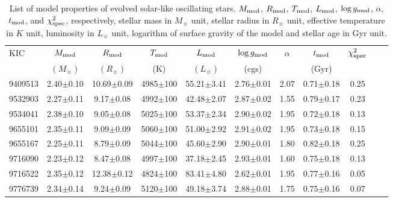 \documentclass[a4paper,fleqn,usenatbib]{mnras}     %
\begin{document}
{\begin{table*}
 \caption{List of model properties of evolved solar-like oscillating stars.
$M_{\rm mod}$, $R_{\rm mod}$, ${T_{\rm mod}}$, $L_{\rm mod}$, ${\log g_{\rm mod}}$, $\alpha$, $t_{\rm mod}$, and ${{\chi^2_{\rm spec}}}$,  respectively, stellar mass in $M_{\sun}$ unit, stellar radius in $R_{\sun}$ unit, effective temperature in $K$ unit, luminosity in $L_{\sun}$ unit, logarithm of surface gravity of the model and stellar age in Gyr unit.}


         \begin{tabular}{lcccccccccr}

       \hline
        KIC   & $M_{\rm mod}$  & $R_{\rm mod}$ & $T_{\rm mod}$ & $L_{\rm mod}$ & ${\log g_{\rm mod}}$&  $\alpha$& $t_{\rm mod}$ & ${{\chi^2_{\rm spec}}}$ \\
              & $(M_{\sun})$ &$(R_{\sun})$ & (K)  & $(L_{\sun})$ &(cgs)&  &(Gyr)&     \\
                \hline
9409513&2.40$\pm$0.10&10.69$\pm$0.09&4985$\pm$100&55.21$\pm$3.41&2.76$\pm$0.01&2.07&0.71$\pm$0.18&0.25\\[2pt]
9532903&2.27$\pm$0.11&9.17$\pm$0.08&4992$\pm$100&42.48$\pm$2.07&2.87$\pm$0.02&1.55&0.79$\pm$0.17&0.23\\[2pt]
9534041&2.38$\pm$0.10&9.05$\pm$0.08&5025$\pm$100&53.37$\pm$2.34&2.90$\pm$0.02&1.95&0.72$\pm$0.18&0.13\\[2pt]
9655101&2.35$\pm$0.11&9.09$\pm$0.09&5060$\pm$100&51.00$\pm$2.92&2.91$\pm$0.02&1.95&0.73$\pm$0.18&0.15\\[2pt]
9655167&2.25$\pm$0.11&8.79$\pm$0.09&5044$\pm$100&45.60$\pm$2.90&2.90$\pm$0.01&1.80&0.82$\pm$0.18&0.25\\[2pt]
9716090&2.23$\pm$0.12&8.47$\pm$0.08&4997$\pm$100&37.18$\pm$2.45&2.93$\pm$0.01&1.60&0.75$\pm$0.18&0.13\\[2pt]
9716522&2.35$\pm$0.12&12.38$\pm$0.12&4824$\pm$100&83.41$\pm$4.80&2.62$\pm$0.01&1.95&0.77$\pm$0.16&0.05\\[2pt]
9776739&2.34$\pm$0.14&9.24$\pm$0.09&5120$\pm$100&49.18$\pm$3.74&2.88$\pm$0.01&1.75&0.75$\pm$0.16&0.07\\[2pt]

               \hline
        \end{tabular}

\end{table*}

}
\end{document}
